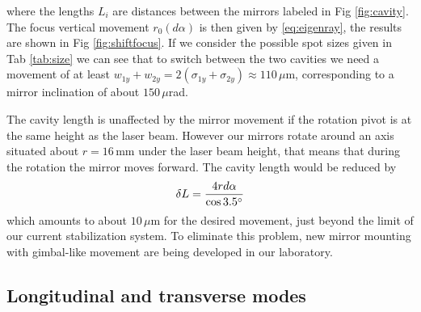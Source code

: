 where the lengths $L_i$ are distances between the mirrors labeled in Fig \ref{fig:cavity}. 
The focus vertical movement $r_0(d\alpha)$ is then given by \ref{eq:eigenray}, the results are shown in Fig \ref{fig:shiftfocus}.
If we consider the possible spot sizes given in Tab \ref{tab:size} we can see that to switch between the two cavities we need a movement of at least $w_{1y}+w_{2y}=2(\sigma_{1y}+\sigma_{2y})\approx 110\,\mu$m, corresponding to a mirror inclination of about $150\,\mu$rad.

The cavity length is unaffected by the mirror movement if the rotation pivot is at the same height as the laser beam. However our mirrors rotate around an axis situated about $r =16$\,mm under the laser beam height, that means that during the rotation the mirror moves forward. The cavity length would be reduced by
\begin{align}
	\delta L = \frac{4 r d\alpha }{\cos 3.5\degree}
\end{align}
which amounts to about $10\,\mu$m for the desired movement, just beyond the limit of our current stabilization system. To eliminate this problem, new mirror mounting with gimbal-like movement are being developed in our laboratory.

\subsection{Longitudinal and transverse modes}

